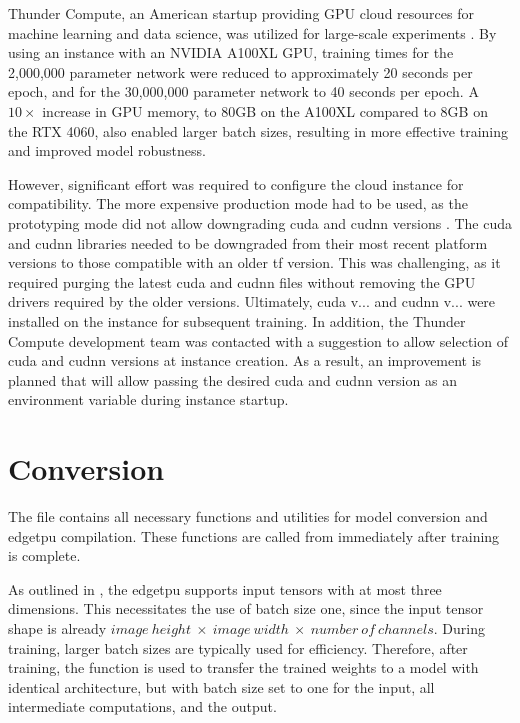 {Thunder Compute, an American startup providing GPU cloud resources for machine learning and data science, was utilized for large-scale experiments \cite{thundercompute}.
By using an instance with an NVIDIA A100XL GPU, training times for the 2,000,000 parameter network were reduced to approximately 20 seconds per epoch,
and for the 30,000,000 parameter network to 40 seconds per epoch.
A \ensuremath{10\times} increase in GPU memory, to 80GB on the A100XL compared to 8GB on the RTX 4060, also enabled larger batch sizes,
resulting in more effective training and improved model robustness.

However, significant effort was required to configure the cloud instance for compatibility.
The more expensive production mode had to be used, as the prototyping mode did not allow downgrading \gls{cuda} and \gls{cudnn} versions \cite{thundercomputeProtProd}.
The \gls{cuda} and \gls{cudnn} libraries needed to be downgraded from their most recent platform versions to those compatible with an older \gls{tf} version.
This was challenging, as it required purging the latest \gls{cuda} and \gls{cudnn} files without removing the GPU drivers required by the older versions.
Ultimately, \gls{cuda} v... and \gls{cudnn} v... were installed on the instance for subsequent training.
In addition, the Thunder Compute development team was contacted with a suggestion to allow selection of \gls{cuda} and \gls{cudnn} versions at instance creation.
As a result, an improvement is planned that will allow passing the desired \gls{cuda} and \gls{cudnn} version as an environment variable during instance startup.

\section{Conversion}
\label{sec:conversion}

The file  contains all necessary functions and utilities for model conversion and \gls{edgetpu} compilation.
These functions are called from  immediately after training is complete.

As outlined in , the \gls{edgetpu} supports input tensors with at most three dimensions.
This necessitates the use of batch size one, since the input tensor shape is already \ensuremath{image~height~\times~image~width~\times~number~of~channels}.
During training, larger batch sizes are typically used for efficiency.
Therefore, after training, the function  is used to transfer the trained weights to a model with identical architecture,
but with batch size set to one for the input, all intermediate computations, and the output.

}
